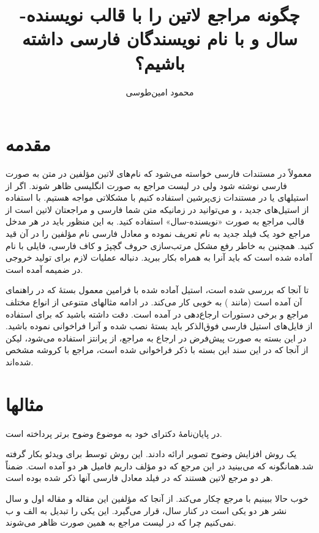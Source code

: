 \documentclass{article} %
\title{چگونه مراجع لاتین را با قالب نویسنده-سال و با نام نویسندگان فارسی داشته باشیم؟}
\author{محمود امین‌طوسی}%
\begin{document}
\maketitle
\section{مقدمه}
معمولاً در مستندات فارسی خواسته می‌شود که نام‌های لاتین مؤلفین در متن به صورت فارسی نوشته شود ولی در لیست مراجع به صورت انگلیسی ظاهر شوند. اگر از استیلهای  یا  در مستندات زی‌پرشین استفاده کنیم با مشکلاتی مواجه هستیم. 
با استفاده از استیل‌های جدید ،   و  می‌توانید در زمانیکه متن شما فارسی و مراجعتان لاتین است از قالب مراجع به صورت «نویسنده-سال» استفاده کنید. به این منظور باید در هر مدخل مراجع خود یک فیلد جدید به نام  تعریف نموده و معادل فارسی نام مؤلفین را در آن قید کنید. همچنین به خاطر رفع مشکل مرتب‌سازی حروف گچپژ و کاف فارسی، فایلی با نام  آماده شده است که باید آنرا به همراه  بکار ببرید.
دنباله عملیات لازم برای تولید خروجی در ضمیمه آمده است.

تا آنجا که بررسی شده است، استیل آماده شده با فرامین معمول بستهٔ  که در راهنمای آن آمده است (مانند ) به خوبی کار می‌کند. در ادامه مثالهای متنوعی از انواع مختلف مراجع و برخی دستورات ارجاع‌دهی در  آمده است. دقت داشته باشید که  برای استفاده از فایل‌های استیل فارسی فوق‌الذکر باید بستهٔ  نصب شده و آنرا فراخوانی نموده باشید. در این بسته به صورت پیش‌فرض در ارجاع به مراجع، از پرانتز استفاده می‌شود، لیکن از آنجا که در این سند این بسته با ذکر \lr{[square]} فراخوانی شده است، مراجع با کروشه مشخص شده‌اند. 
\section{مثالها}

\citet{Borman04thesis} در پایان‌نامهٔ دکترای خود به موضوع وضوح برتر پرداخته است.

\citet{Amintoosi09precise} یک روش افزایش وضوح تصویر ارائه دادند. این روش توسط \citet{Amintoosi09video} برای ویدئو بکار گرفته شد.همانگونه که می‌بینید در این مرجع که دو مؤلف داریم فامیل هر دو آمده است. ضمناً هر دو مرجع لاتین هستند که در فیلد  معادل فارسی آنها ذکر شده بوده است.

خوب حالا ببینیم با مرجع \citep{Amintoosi09regional} چکار می‌کند. از آنجا که مؤلفین این مقاله و مقاله اول و سال نشر هر دو یکی است در کنار سال،  قرار می‌گیرد. این یکی را تبدیل به الف و ب نمی‌کنیم چرا که در لیست مراجع به همین صورت ظاهر می‌شوند.
\end{document}

